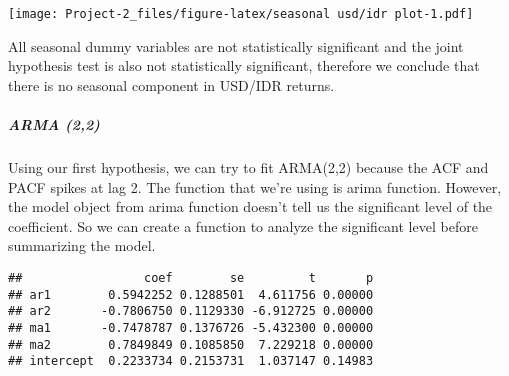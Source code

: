 \documentclass[]{article}
\newenvironment{Shaded}{\begin{snugshade}}{\end{snugshade}}
\newcommand{\KeywordTok}[1]{\textcolor[rgb]{0.13,0.29,0.53}{\textbf{#1}}}
\newcommand{\DataTypeTok}[1]{\textcolor[rgb]{0.13,0.29,0.53}{#1}}
\newcommand{\DecValTok}[1]{\textcolor[rgb]{0.00,0.00,0.81}{#1}}
\newcommand{\StringTok}[1]{\textcolor[rgb]{0.31,0.60,0.02}{#1}}
\newcommand{\CommentTok}[1]{\textcolor[rgb]{0.56,0.35,0.01}{\textit{#1}}}
\newcommand{\OtherTok}[1]{\textcolor[rgb]{0.56,0.35,0.01}{#1}}
\newcommand{\ControlFlowTok}[1]{\textcolor[rgb]{0.13,0.29,0.53}{\textbf{#1}}}
\newcommand{\OperatorTok}[1]{\textcolor[rgb]{0.81,0.36,0.00}{\textbf{#1}}}
\newcommand{\NormalTok}[1]{#1}
\let\oldsubparagraph\subparagraph
\renewcommand{\subparagraph}[1]{\oldsubparagraph{#1}\mbox{}}
\begin{document}
\texttt{[image: Project-2\_files/figure-latex/seasonal usd/idr plot-1.pdf]}

All seasonal dummy variables are not statistically significant and the
joint hypothesis test is also not statistically significant, therefore
we conclude that there is no seasonal component in USD/IDR returns.

\subparagraph{ARMA (2,2)}\label{arma-22}

Using our first hypothesis, we can try to fit ARMA(2,2) because the ACF
and PACF spikes at lag 2. The function that we're using is arima
function. However, the model object from arima function doesn't tell us
the significant level of the coefficient. So we can create a function to
analyze the significant level before summarizing the model.

\begin{Shaded}
\end{Shaded}

\begin{verbatim}
##                 coef        se         t       p
## ar1        0.5942252 0.1288501  4.611756 0.00000
## ar2       -0.7806750 0.1129330 -6.912725 0.00000
## ma1       -0.7478787 0.1376726 -5.432300 0.00000
## ma2        0.7849849 0.1085850  7.229218 0.00000
## intercept  0.2233734 0.2153731  1.037147 0.14983
\end{verbatim}
\end{document}
